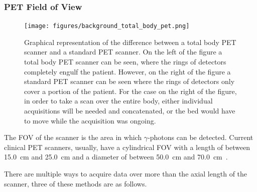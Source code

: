             \subsubsection{PET Field of View} \label{sec:pet_field_of_view}
                \begin{figure}
                    \centering
                    
                    \texttt{[image: figures/background\_total\_body\_pet.png]}
                    
                    \captionsetup{singlelinecheck=false}
                    \caption{
                        Graphical representation of the difference between a total body \gls{PET} scanner and a standard \gls{PET} scanner. On the left of the figure a total body \gls{PET} scanner can be seen, where the rings of detectors completely engulf the patient. However, on the right of the figure a standard \gls{PET} scanner can be seen where the rings of detectors only cover a portion of the patient. For the case on the right of the figure, in order to take a scan over the entire body, either individual acquisitions will be needed and concatenated, or the bed would have to move while the acquisition was ongoing.
                    }
                    \label{fig:pet_fov_total_body_pet}
                \end{figure}
                
                The \gls{FOV} of the scanner is the area in which $\gamma$-photons can be detected. Current clinical \gls{PET} scanners, usually, have a cylindrical \gls{FOV} with a length of between \SI{15.0}{\centi\metre} and \SI{25.0}{\centi\metre} and a diameter of between \SI{50.0}{\centi\metre} and \SI{70.0}{\centi\metre}~\parencite{Pan2019}.
                
                There are multiple ways to acquire data over more than the axial length of the scanner, three of these methods are as follows.
                

